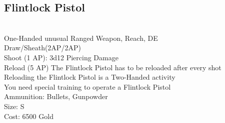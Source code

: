\subsection{Flintlock Pistol}\label{weapon:flintlockPistol}\\
One-Handed unusual Ranged Weapon,  Reach, DE\\
Draw/Sheath(2AP/2AP)\\
Shoot (1 AP): 3d12 Piercing Damage\\
Reload (5 AP) The Flintlock Pistol has to be reloaded after every shot\\
Reloading the Flintlock Pistol is a Two-Handed activity\\
You need special training to operate a Flintlock Pistol\\
Ammunition: Bullets, Gunpowder\\
Size: S\\
Cost: 6500 Gold\\